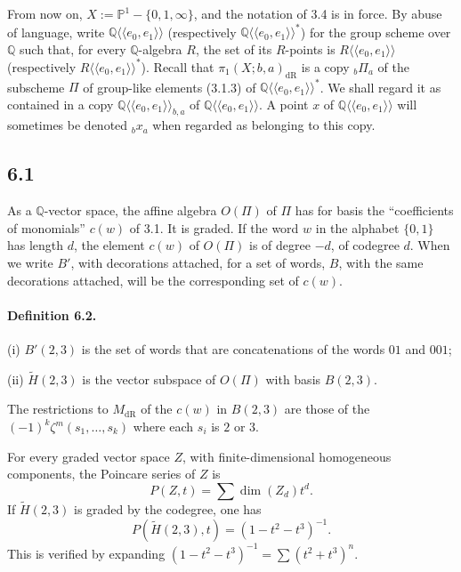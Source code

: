 \documentclass[11pt]{article}
\newcommand{\Q}{\mathbb Q}
\newcommand{\PP}{\mathbb P}
\newcommand{\dR}{\mathrm{dR}}
\begin{document}
From now on, $X:=\PP^1-\{0,1,\infty\}$, and the notation of 3.4 is in force.
By abuse of language, write $\Q\langle\!\langle e_0,e_1\rangle\!\rangle$ (respectively $\Q\langle\!\langle e_0,e_1\rangle\!\rangle^*$) for the group scheme over $\Q$ such that, for every $\Q$-algebra $R$, the set of its $R$-points is $R\langle\!\langle e_0,e_1\rangle\!\rangle$ (respectively $R\langle\!\langle e_0,e_1\rangle\!\rangle^*$).
Recall that $\pi_1(X;b,a)_{\dR}$ is a copy ${}_b\Pi_a$ of the subscheme $\Pi$ of group-like elements (3.1.3) of $\Q\langle\!\langle e_0,e_1\rangle\!\rangle^*$.
We shall regard it as contained in a copy $\Q\langle\!\langle e_0,e_1\rangle\!\rangle_{b,a}$ of $\Q\langle\!\langle e_0,e_1\rangle\!\rangle$.
A point $x$ of $\Q\langle\!\langle e_0,e_1\rangle\!\rangle$ will sometimes be denoted ${}_b x_a$ when regarded as belonging to this copy.

\subsection*{6.1}
As a $\Q$-vector space, the affine algebra $O(\Pi)$ of $\Pi$ has for basis the ``coefficients of monomials'' $c(w)$ of 3.1.
It is graded.
If the word $w$ in the alphabet $\{0,1\}$ has length $d$, the element $c(w)$ of $O(\Pi)$ is of degree $-d$, of codegree $d$.
When we write $B'$, with decorations attached, for a set of words, $B$, with the same decorations attached, will be the corresponding set of $c(w)$.

\paragraph{Definition 6.2.}
(i) $B'(2,3)$ is the set of words that are concatenations of the words $01$ and $001$;

(ii) $\widetilde H(2,3)$ is the vector subspace of $O(\Pi)$ with basis $B(2,3)$.

The restrictions to $M_{\dR}$ of the $c(w)$ in $B(2,3)$ are those of the $(-1)^k\zeta^m(s_1,\ldots,s_k)$ where each $s_i$ is $2$ or $3$.

For every graded vector space $Z$, with finite-dimensional homogeneous components, the Poincare series of $Z$ is
\begin{equation}
 P(Z,t)=\sum \dim(Z_d)t^d.
\tag{6.2.1}
\end{equation}
If $\widetilde H(2,3)$ is graded by the codegree, one has
\begin{equation}
 P(\widetilde H(2,3),t)=(1-t^2-t^3)^{-1}.
\tag{6.2.2}
\end{equation}
This is verified by expanding $(1-t^2-t^3)^{-1}=\sum(t^2+t^3)^n$.
\end{document}
